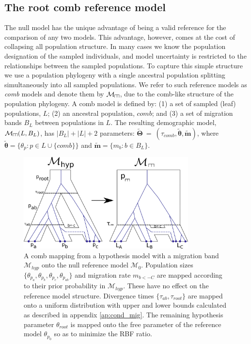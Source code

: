 \documentclass[11pt]{article}
\newcommand{\vect}[1]{\boldsymbol{\mathbf{#1}}}
\newcommand{\M}{\mathcal{M}}
\newcommand{\T}{\vect{\Theta}}
\newcommand{\Tref}{\widetilde{\T}}
\newcommand{\1}{\mathbbm{1}}
\def\comb{\rotatebox[origin=c]{90}{$\exists$}}
\newcommand{\Mcomb}{\M_{\comb}}
\newcommand{\thetas}{\vect\theta}
\newcommand{\migs}{\vect{m}}
\newcommand{\tacomb}{\tau_{comb}}
\def\comb{\rotatebox[origin=c]{90}{$\exists$}}
\begin{document}
\subsection{The root comb reference model} %

The null model has the unique advantage of being a valid reference for the comparison of any two models.
This advantage, however, comes at the cost of collapsing all population structure.
%
In many cases we know the population designation of the sampled individuals, and model uncertainty is restricted to the relationships between the sampled populations.
%
To capture this simple structure we use a population phylogeny with a single ancestral population splitting simultaneously into all sampled populations.
We refer to such reference models as {\em comb} models and denote them by $\Mcomb$,  due to the comb-like structure of the population phylogeny.
%
A comb model is defined by: (1) a set of sampled (leaf) populations, $L$; (2) an ancestral population, $comb$; and (3) a set of migration bands $B_L$ between populations in $L$.
%
The resulting demographic model, $\Mcomb(L,B_L)$, has $|B_L|+|L|+2$ parameters: $\Tref ~=~ (\tacomb, \widetilde{\thetas},\widetilde{\migs})$,
where $\widetilde{\thetas}=\{\theta_p:p\in L\cup \{comb\}\}$ and $\widetilde{\migs} = \{m_b:b\in B_L\}$.
%

\begin{figure}[h]
\centering
\includegraphics[width=0.8\textwidth]
{comb_model_with_migration_single_genealogy}
\captionsetup{width=.8\textwidth}
\caption{A comb mapping from a hypothesis model with a migration band $\M_{hyp}$ onto the null reference model $\M_0$. Population sizes $\{\theta_{p_a}, \theta_{p_b}, \theta_{p_c}, \theta_{p_{ab}}\}$ and migration rate $m_{b<-C}$ are mapped according to their prior probability in $\M_{hyp}$. These have no effect on the reference model structure. Divergence times $\{\tau_{ab}, \tau_{root}\}$ are mapped onto a uniform distribution with upper and lower bounds calculated as described in appendix \ref{ap:cond_mig}. The remaining hypothesis parameter $\theta_{root}$ is mapped onto the free parameter of the reference model $\theta_{p_0}$ so as to minimize the RBF ratio.}
\label{fig:comb_model_with_migration_single_genealogy}
\end{figure}
\end{document}
